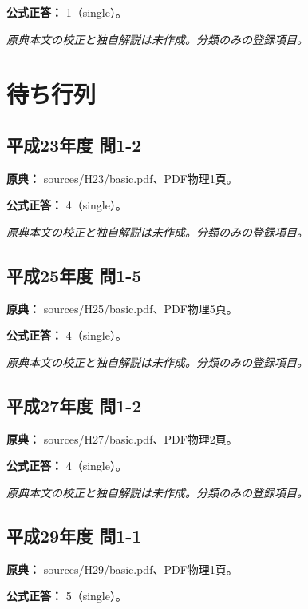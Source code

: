 \textbf{公式正答：} 1（single）。

\par\textit{原典本文の校正と独自解説は未作成。分類のみの登録項目。}

\section{待ち行列}

\subsection{平成23年度 問1-2}
\label{q:h23-reg-basic-1-2}

\noindent\textbf{原典：} sources/H23/basic.pdf、PDF物理1頁。

\textbf{公式正答：} 4（single）。

\par\textit{原典本文の校正と独自解説は未作成。分類のみの登録項目。}

\subsection{平成25年度 問1-5}
\label{q:h25-reg-basic-1-5}

\noindent\textbf{原典：} sources/H25/basic.pdf、PDF物理5頁。

\textbf{公式正答：} 4（single）。

\par\textit{原典本文の校正と独自解説は未作成。分類のみの登録項目。}

\subsection{平成27年度 問1-2}
\label{q:h27-reg-basic-1-2}

\noindent\textbf{原典：} sources/H27/basic.pdf、PDF物理2頁。

\textbf{公式正答：} 4（single）。

\par\textit{原典本文の校正と独自解説は未作成。分類のみの登録項目。}

\subsection{平成29年度 問1-1}
\label{q:h29-reg-basic-1-1}

\noindent\textbf{原典：} sources/H29/basic.pdf、PDF物理1頁。

\textbf{公式正答：} 5（single）。

